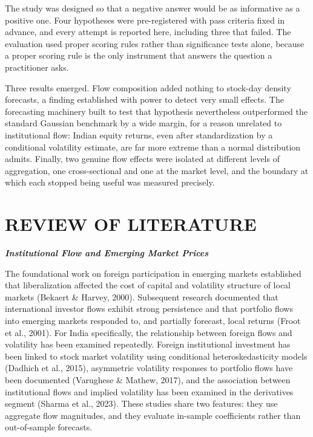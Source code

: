 \documentclass[12pt]{article}
\begin{document}
The study was designed so that a negative answer would be as informative as a
positive one. Four hypotheses were pre-registered with pass criteria fixed in
advance, and every attempt is reported here, including three that failed. The
evaluation used proper scoring rules rather than significance tests alone,
because a proper scoring rule is the only instrument that answers the question
a practitioner asks.

Three results emerged. Flow composition added nothing to stock-day density
forecasts, a finding established with power to detect very small effects. The
forecasting machinery built to test that hypothesis nevertheless outperformed
the standard Gaussian benchmark by a wide margin, for a reason unrelated to
institutional flow: Indian equity returns, even after standardization by a
conditional volatility estimate, are far more extreme than a normal
distribution admits. Finally, two genuine flow effects were isolated at
different levels of aggregation, one cross-sectional and one at the market
level, and the boundary at which each stopped being useful was measured
precisely.

\section*{REVIEW OF LITERATURE}

\textbf{\emph{Institutional Flow and Emerging Market Prices}}

The foundational work on foreign participation in emerging markets established
that liberalization affected the cost of capital and volatility structure of
local markets (Bekaert \& Harvey, 2000). Subsequent research documented that
international investor flows exhibit strong persistence and that portfolio
flows into emerging markets responded to, and partially forecast, local
returns (Froot et al., 2001). For India specifically, the relationship between
foreign flows and volatility has been examined repeatedly. Foreign
institutional investment has been linked to stock market volatility using
conditional heteroskedasticity models (Dadhich et al., 2015), asymmetric
volatility responses to portfolio flows have been documented (Varughese \&
Mathew, 2017), and the association between institutional flows and implied
volatility has been examined in the derivatives segment (Sharma et al.,
2023). These studies share two features: they use aggregate flow magnitudes,
and they evaluate in-sample coefficients rather than out-of-sample forecasts.
\end{document}
